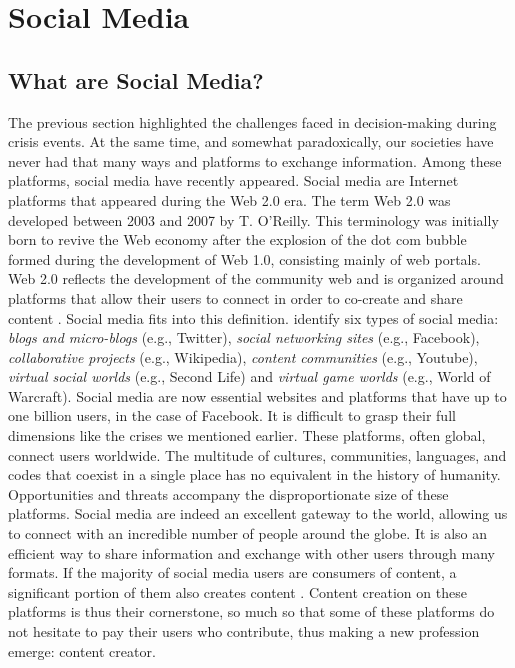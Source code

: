 \section{Social Media}
\subsection{What are Social Media?}
The previous section highlighted the challenges faced in decision-making during crisis events.
At the same time, and somewhat paradoxically, our societies have never had that many ways and platforms to exchange information.
Among these platforms, social media have recently appeared.
Social media are Internet platforms that appeared during the Web 2.0 era.
The term Web 2.0 was developed between 2003 and 2007 by T. O'Reilly.
This terminology was initially born to revive the Web economy after the explosion of the dot com bubble formed during the development of Web 1.0, consisting mainly of web portals.
Web 2.0 reflects the development of the community web and is organized around platforms that allow their users to connect in order to co-create and share content \textcite{oreillyWhatWebDesign2007b}.
Social media fits into this definition.
\textcite{kaplanUsersWorldUnite2010} identify six types of social media: \emph{blogs and micro-blogs} (e.g., Twitter), \emph{social networking sites} (e.g., Facebook), \emph{collaborative projects} (e.g., Wikipedia), \emph{content communities} (e.g., Youtube), \emph{virtual social worlds} (e.g., Second Life) and \emph{virtual game worlds} (e.g., World of Warcraft).
Social media are now essential websites and platforms that have up to one billion users, in the case of Facebook.
It is difficult to grasp their full dimensions like the crises we mentioned earlier.
These platforms, often global, connect users worldwide.
The multitude of cultures, communities, languages, and codes that coexist in a single place has no equivalent in the history of humanity.
Opportunities and threats accompany the disproportionate size of these platforms.
Social media are indeed an excellent gateway to the world, allowing us to connect with an incredible number of people around the globe.
It is also an efficient way to share information and exchange with other users through many formats.
If the majority of social media users are consumers of content, a significant portion of them also creates content \parencite{fuchsSocialMediaCritical2021}.
Content creation on these platforms is thus their cornerstone, so much so that some of these platforms do not hesitate to pay their users who contribute, thus making a new profession emerge: content creator.

